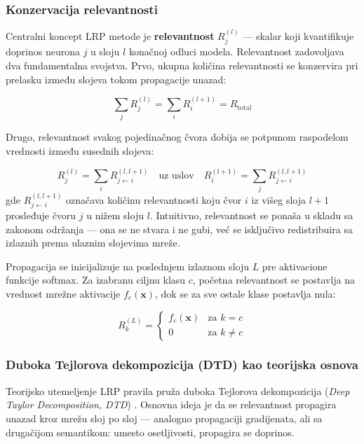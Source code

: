 \subsubsection{Konzervacija relevantnosti}

Centralni koncept LRP metode je \textbf{relevantnost} $R_j^{(l)}$ — skalar koji kvantifikuje doprinos neurona $j$ u sloju $l$ konačnoj odluci modela. Relevantnost zadovoljava dva fundamentalna svojstva. Prvo, ukupna količina relevantnosti se konzervira pri prelasku između slojeva tokom propagacije unazad:

\begin{equation}
    \sum_j R_j^{(l)} = \sum_i R_i^{(l+1)} = R_{\text{total}}
    \label{eq:conservation}
\end{equation}

Drugo, relevantnost svakog pojedinačnog čvora dobija se potpunom raspodelom vrednosti između susednih slojeva:

\begin{equation}
    R_j^{(l)} = \sum_i R_{j \leftarrow i}^{(l, l+1)} \quad \text{uz uslov} \quad R_i^{(l+1)} = \sum_j R_{j \leftarrow i}^{(l, l+1)}
\end{equation}
gde $R_{j \leftarrow i}^{(l, l+1)}$ označava količinu relevantnosti koju čvor $i$ iz višeg sloja $l+1$ prosleđuje čvoru $j$ u nižem sloju $l$. Intuitivno, relevantnost se ponaša u skladu sa zakonom održanja — ona se ne stvara i ne gubi, već se isključivo redistribuira sa izlaznih prema ulaznim slojevima mreže.

Propagacija se inicijalizuje na poslednjem izlaznom sloju $L$ pre aktivacione funkcije softmax. Za izabranu ciljnu klasu $c$, početna relevantnost se postavlja na vrednost mrežne aktivacije $f_c(\mathbf{x})$, dok se za sve ostale klase postavlja nula:

\begin{equation}
    R_k^{(L)} = 
    \begin{cases}
        f_c(\mathbf{x}) & \text{za } k = c \\
        0 & \text{za } k \neq c
    \end{cases}
\end{equation}
\subsubsection{Duboka Tejlorova dekompozicija (DTD) kao teorijska osnova}

Teorijsko utemeljenje LRP pravila pruža duboka Tejlorova dekompozicija (\textit{Deep Taylor Decomposition, DTD}) 
\cite{montavon2017explaining}. Osnovna ideja je da se relevantnost propagira 
unazad kroz mrežu sloj po sloj — analogno propagaciji gradijenata, ali sa 
drugačijom semantikom: umesto osetljivosti, propagira se doprinos.

